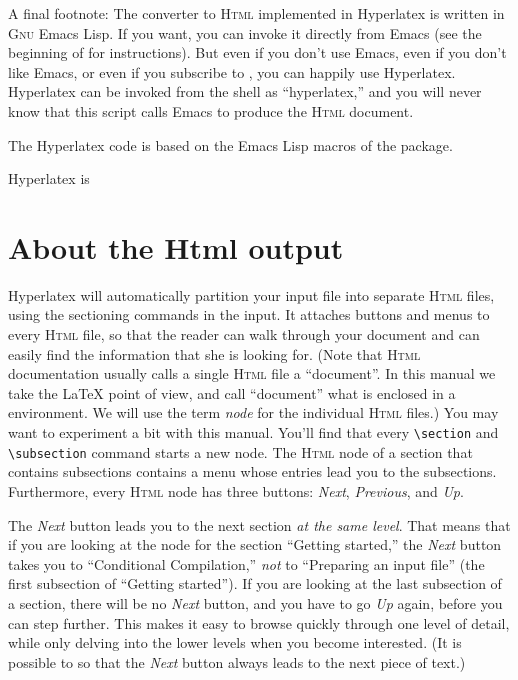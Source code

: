\documentclass{article}
\newcommand{\+}{\verb+}
\renewcommand{\*}{\back{}}
\newcommand{\Html}{\textsc{Html}\xspace }
\newcommand{\latex}{\LaTeX\xspace }
\begin{document}
A final footnote: The converter to \Html implemented in Hyperlatex is
written in \textsc{Gnu} Emacs Lisp. If you want, you can invoke it
directly from Emacs (see the beginning of  for
instructions). But even if you don't use Emacs, even if you don't like
Emacs, or even if you subscribe to ,
you can happily use Hyperlatex.  Hyperlatex can be invoked from the
shell as ``hyperlatex,'' and you will never know that this script
calls Emacs to produce the \Html document.

The Hyperlatex code is based on the Emacs Lisp macros of the
 package.

Hyperlatex is 

\section{About the Html output}
\label{sec:about-html}

\label{nodes}
 Hyperlatex will automatically partition your input file
into separate \Html files, using the sectioning commands in the input.
It attaches buttons and menus to every \Html file, so that the reader
can walk through your document and can easily find the information
that she is looking for.  (Note that \Html documentation usually calls
a single \Html file a ``document''. In this manual we take the
\latex point of view, and call ``document'' what is enclosed in a
 environment. We will use the term \emph{node} for the
individual \Html files.)  You may want to experiment a bit with
\texonly{the \Html version of} this manual. You'll find that every
\+\section+ and \+\subsection+ command starts a new node. The \Html
node of a section that contains subsections contains a menu whose
entries lead you to the subsections. Furthermore, every \Html node has
three buttons: \emph{Next}, \emph{Previous}, and \emph{Up}.

The \emph{Next} button leads you to the next section \emph{at the same
  level}. That means that if you are looking at the node for the
section ``Getting started,'' the \emph{Next} button takes you to
``Conditional Compilation,'' \emph{not} to ``Preparing an input file''
(the first subsection of ``Getting started''). If you are looking at
the last subsection of a section, there will be no \emph{Next} button,
and you have to go \emph{Up} again, before you can step further.  This
makes it easy to browse quickly through one level of detail, while
only delving into the lower levels when you become interested.  (It is
possible to  so that
the \emph{Next} button always leads to the next piece of
text.)
\end{document}
